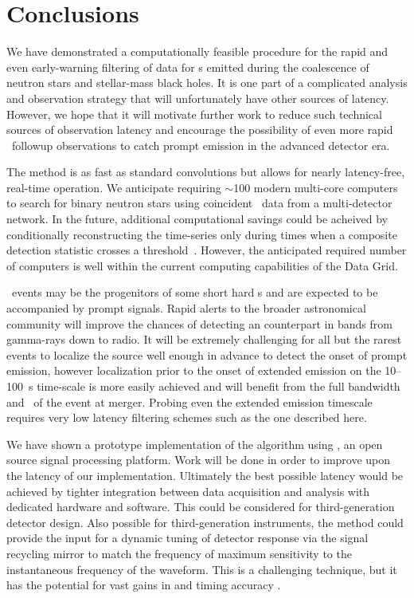 \section{Conclusions}
\label{sec:conclusions}

We have demonstrated a computationally feasible procedure for the rapid and
even early-warning filtering of data for \GW{}s emitted during the coalescence
of neutron stars and stellar-mass black holes.  It is one part of a complicated
analysis and observation strategy that will unfortunately have other sources of
latency.  However, we hope that it will motivate further work to reduce such
technical sources of \GW{} observation latency and encourage the possibility of
even more rapid \EM\ followup observations to catch prompt emission in the
advanced detector era.  

The \lloid{} method is as fast as standard \fft{} convolutions but allows for
nearly latency-free, real-time operation.  We anticipate requiring $\sim$100
modern multi-core computers to search for binary neutron stars using
coincident \GW\ data from a multi-detector network.  In the future, additional
computational savings could be acheived by conditionally reconstructing the
\SNR{} time-series only during times when a composite detection statistic
crosses a threshold~\citep{svd-compdetstat}.  However, the anticipated required
number of computers is well within the current computing capabilities of the
\LIGO{} Data Grid.

\CBC\ events may be the progenitors of some short hard \GRB{}s and are expected
to be accompanied by prompt \EM{} signals.  Rapid alerts to the broader
astronomical community will improve the chances of detecting an \EM{}
counterpart in bands from gamma-rays down to radio.  It will be extremely
challenging for all but the rarest events to localize the source well enough in
advance to detect the onset of prompt emission, however localization prior to
the onset of extended emission on the 10--100~s time-scale is more easily
achieved and will benefit from the full bandwidth and \SNR\ of the \GW{} event
at merger.  Probing even the extended emission timescale requires very low
latency filtering schemes such as the one described here.

We have shown a prototype implementation of the \lloid{} algorithm using
\gstreamer, an open source signal processing platform.  Work will be done in
order to improve upon the latency of our implementation.  Ultimately the best
possible latency would be achieved by tighter integration between data
acquisition and analysis with dedicated hardware and software. This could be
considered for third-generation detector design.  Also possible for
third-generation instruments, the \lloid{} method could provide the input for a
dynamic tuning of detector response via the signal recycling mirror to match
the frequency of maximum sensitivity to the instantaneous frequency of the
\GW{} waveform.  This is a challenging technique, but it has the potential for
vast gains in \SNR{} and timing accuracy \citep{PhysRevD.47.2184}.

